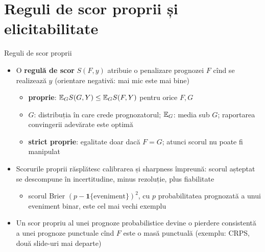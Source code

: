 \section{Reguli de scor proprii și elicitabilitate}

\begin{frame}{Reguli de scor proprii}
\itemsize{\small}
\begin{itemize}
    \item O \textbf{regulă de scor} $S(F, y)$ atribuie o penalizare prognozei $F$ cînd se realizează $y$ (orientare negativă: mai mic este mai bine)
    \begin{itemize}
        \item \textbf{proprie}: $\mathbb{E}_G S(G, Y) \le \mathbb{E}_G S(F, Y)$ pentru orice $F, G$ 
        \item $G$: distribuția în care crede prognozatorul; $\mathbb{E}_G$: media sub $G$; raportarea convingerii adevărate este optimă
        \item \textbf{strict proprie}: egalitate doar dacă $F = G$; atunci scorul nu poate fi manipulat
    \end{itemize}
    \item Scorurile proprii răsplătesc calibrarea și sharpness împreună: scorul așteptat se descompune în incertitudine, minus rezoluție, plus fiabilitate
    \begin{itemize}
        \item scorul Brier $(p - \mathbf 1\{\text{eveniment}\})^2$, cu $p$ probabilitatea prognozată a unui eveniment binar, este cel mai vechi exemplu 
    \end{itemize}
    \item Un scor propriu al unei prognoze probabilistice devine o pierdere consistentă a unei prognoze punctuale cînd $F$ este o masă punctuală (exemplu: CRPS, două slide-uri mai departe)
\end{itemize}
\end{frame}

